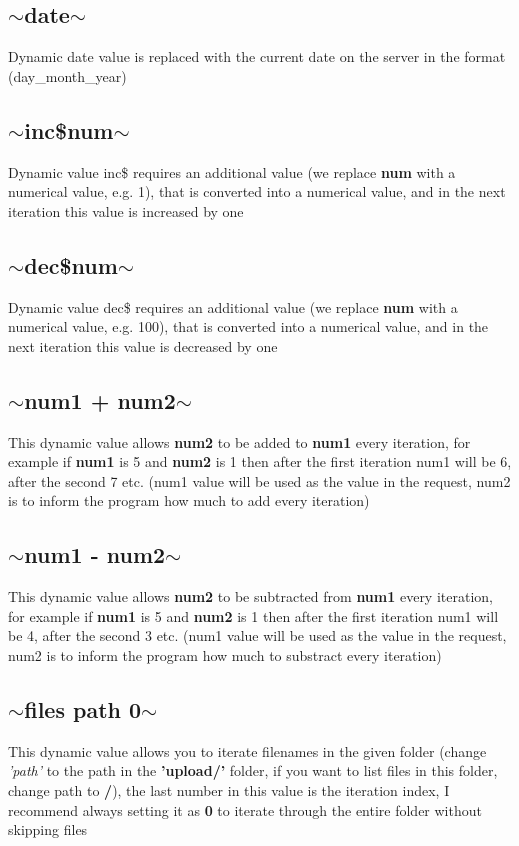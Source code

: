 \documentclass{article}
\begin{document}
\subsection{$\sim$date$\sim$}
Dynamic date value is replaced with the current date on the server in the format (day\_month\_year)
\subsection{$\sim$inc\$num$\sim$}
Dynamic value inc\$ requires an additional value (we replace \textbf{num} with a numerical value, e.g. 1), that is converted into a numerical value, and in the next iteration this value is increased by one
\subsection{$\sim$dec\$num$\sim$}
Dynamic value dec\$ requires an additional value (we replace \textbf{num} with a numerical value, e.g. 100), that is converted into a numerical value, and in the next iteration this value is decreased by one
\subsection{$\sim$num1 + num2$\sim$}
This dynamic value allows \textbf{num2} to be added to \textbf{num1} every iteration, for example if \textbf{num1} is 5 and \textbf{num2} is 1 then after the first iteration num1 will be 6, after the second 7 etc. (num1 value will be used as the value in the request, num2 is to inform the program how much to add every iteration)
\subsection{$\sim$num1 - num2$\sim$}
This dynamic value allows \textbf{num2} to be subtracted from \textbf{num1} every iteration, for example if \textbf{num1} is 5 and \textbf{num2} is 1 then after the first iteration num1 will be 4, after the second 3 etc. (num1 value will be used as the value in the request, num2 is to inform the program how much to substract every iteration)
\subsection{$\sim$files path 0$\sim$}
This dynamic value allows you to iterate filenames in the given folder (change \textit{'path'} to the path in the \textbf{'upload/'} folder, if you want to list files in this folder, change path to \textbf{/}), the last number in this value is the iteration index, I recommend always setting it as \textbf{0} to iterate through the entire folder without skipping files
\end{document}
